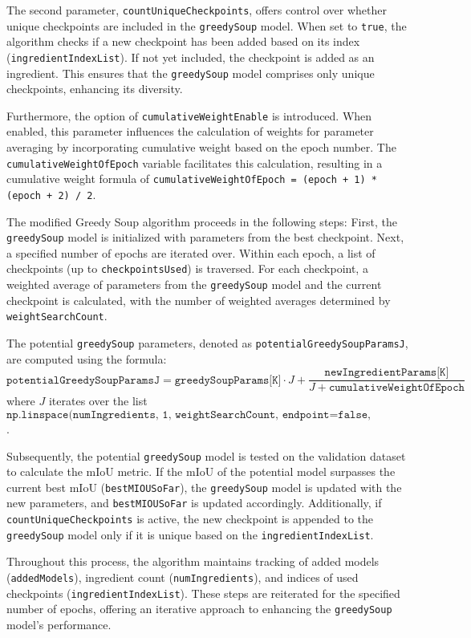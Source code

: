 \documentclass[10pt,twocolumn,letterpaper]{article}
\begin{document}
The second parameter, \texttt{countUniqueCheckpoints}, offers control over whether unique checkpoints are included in the \texttt{greedySoup} model. When set to \texttt{true}, the algorithm checks if a new checkpoint has been added based on its index (\texttt{ingredientIndexList}). If not yet included, the checkpoint is added as an ingredient. This ensures that the \texttt{greedySoup} model comprises only unique checkpoints, enhancing its diversity.

Furthermore, the option of \texttt{cumulativeWeightEnable} is introduced. When enabled, this parameter influences the calculation of weights for parameter averaging by incorporating cumulative weight based on the epoch number. The \texttt{cumulativeWeightOfEpoch} variable facilitates this calculation, resulting in a cumulative weight formula of \texttt{cumulativeWeightOfEpoch = (epoch + 1) * (epoch + 2) / 2}.

The modified Greedy Soup algorithm proceeds in the following steps: First, the \texttt{greedySoup} model is initialized with parameters from the best checkpoint. Next, a specified number of epochs are iterated over. Within each epoch, a list of checkpoints (up to \texttt{checkpointsUsed}) is traversed. For each checkpoint, a weighted average of parameters from the \texttt{greedySoup} model and the current checkpoint is calculated, with the number of weighted averages determined by \texttt{weightSearchCount}.

The potential \texttt{greedySoup} parameters, denoted as \texttt{potentialGreedySoupParamsJ}, are computed using the formula:
\[ \texttt{potentialGreedySoupParamsJ} = \texttt{greedySoupParams[K]} \cdot J + \frac{\texttt{newIngredientParams[K]}}{J + \texttt{cumulativeWeightOfEpoch}} \]
where $J$ iterates over the list $\texttt{np.linspace(numIngredients, 1, weightSearchCount, endpoint=false, dtype=int)}$.

Subsequently, the potential \texttt{greedySoup} model is tested on the validation dataset to calculate the mIoU metric. If the mIoU of the potential model surpasses the current best mIoU (\texttt{bestMIOUSoFar}), the \texttt{greedySoup} model is updated with the new parameters, and \texttt{bestMIOUSoFar} is updated accordingly. Additionally, if \texttt{countUniqueCheckpoints} is active, the new checkpoint is appended to the \texttt{greedySoup} model only if it is unique based on the \texttt{ingredientIndexList}.

Throughout this process, the algorithm maintains tracking of added models (\texttt{addedModels}), ingredient count (\texttt{numIngredients}), and indices of used checkpoints (\texttt{ingredientIndexList}). These steps are reiterated for the specified number of epochs, offering an iterative approach to enhancing the \texttt{greedySoup} model's performance.
\end{document}
